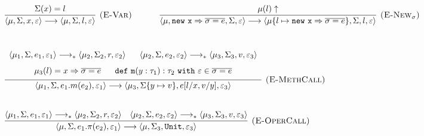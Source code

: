 \documentclass{llncs}
\newcommand{\keywadj}[1]{\mathtt{#1}}
\newcommand{\keyw}[1]{\keywadj{#1}~}
\newcommand{\config}[1] { \langle #1 \rangle }
\begin{document}
\fbox{$\config{\mu, \Sigma, e, \varepsilon} \simeq \config{\mu, \Sigma, e, \varepsilon}$}


\[
\begin{array}{lll}
\begin{array}{lllr}
	\infer[\textsc{(E-Var)}]
		{\config{\mu, \Sigma, x, \varepsilon}
			\longrightarrow
		 \config{\mu, \Sigma, l, \varepsilon}}
		{\Sigma(x) = l}
~~~~~~~~~~
	\infer[\textsc{(E-New$_\sigma$)}]
		{\config{\mu, \keywadj{new~x} \Rightarrow \overline{\sigma = e}, \Sigma, \varepsilon }
			\longrightarrow
		 \config{\mu\{ l \mapsto \keywadj{new~x} \Rightarrow \overline{\sigma = e} \},  \Sigma, l, \varepsilon }}
		{\mu(l) \uparrow} \\[5ex]
		
	\infer[\textsc{(E-MethCall)}]
		{\config{\mu_1, \Sigma, e_1.m(e_2), \varepsilon_1}
			\longrightarrow
		 \config{\mu_3, \Sigma\{ y \mapsto v \}, e[l/x, v/y], \varepsilon_3}}
  		{\def\arraystretch{1.6}
  			\begin{array}{c}
  				\config{\mu_1, \Sigma, e_1, \varepsilon_1}
					\longrightarrow_*
				\config{\mu_2, \Sigma_2, r, \varepsilon_2} ~~~~~
				\config{\mu_2, \Sigma, e_2, \varepsilon_2}
					\longrightarrow_*
				\config{\mu_3, \Sigma_3, v, \varepsilon_3}\\
  		        \mu_3(l) = x \Rightarrow \overline{\sigma = e} ~~~~~
			    \keywadj{def~m}(y: \tau_1) : \tau_2~\keyw{with} \varepsilon \in \overline {\sigma = e}
			\end{array} }\\[5ex]
			
	\infer[\textsc{(E-OperCall)}]
		{\config{\mu, \Sigma, e_1.\pi(e_2), \varepsilon_1}
			\longrightarrow
		\config{\mu, \Sigma_3, \keywadj{Unit}, \varepsilon_3}}
		{\config{\mu_1, \Sigma, e_1, \varepsilon_1}
			\longrightarrow_*
		 \config{\mu_2, \Sigma_2, r, \varepsilon_2} &
		 \config{\mu_2, \Sigma, e_2, \varepsilon_2}
			\longrightarrow_*
		 \config{\mu_3, \Sigma_3, v, \varepsilon_3} }
			
\end{array}
\end{array}
\]
\end{document}
